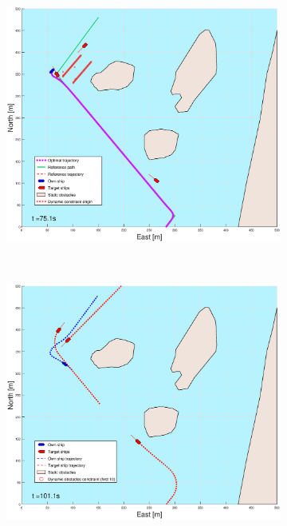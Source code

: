\begin{figure}[!ht]
\begin{subfigure}[b]{0.49\textwidth}
    \end{subfigure}
    \hfill
    \begin{subfigure}[b]{0.499\textwidth}
        \centering
        \includegraphics[width=\textwidth]{Images/Figures/Helloya_Rev/_Simple_0fig999_time=75}
    \end{subfigure}
    \hfill
    \\
    \begin{subfigure}[b]{0.49\textwidth}
        \centering
        \includegraphics[width=\textwidth]{Images/Figures/Helloya_Rev/_Simple_0fig1_time=101}

\end{subfigure}
\end{figure}
